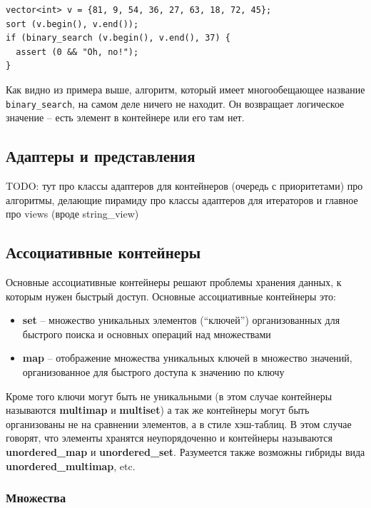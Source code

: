 \documentclass[a4paper,12pt,oneside]{article}
\begin{document}
\begin{lstlisting}
vector<int> v = {81, 9, 54, 36, 27, 63, 18, 72, 45};
sort (v.begin(), v.end());
if (binary_search (v.begin(), v.end(), 37) {
  assert (0 && "Oh, no!");
}
\end{lstlisting}

Как видно из примера выше, алгоритм, который имеет многообещающее название \lstinline!binary_search!, на самом деле ничего не находит. Он возвращает логическое значение -- есть элемент в контейнере или его там нет.

\pagebreak
\subsection{Адаптеры и представления}\label{subsec:adapters}

TODO: тут 
про классы адаптеров для контейнеров (очередь с приоритетами)
про алгоритмы, делающие пирамиду
про классы адаптеров для итераторов
и главное про views (вроде string\_view)

\pagebreak
\subsection{Ассоциативные контейнеры}\label{AssociativeContainers}

Основные ассоциативные контейнеры решают проблемы хранения данных, к которым нужен быстрый доступ. Основные ассоциативные контейнеры это:

\begin{itemize}
\item \textbf{set} -- множество уникальных элементов (``ключей'') организованных для быстрого поиска и основных операций над множествами
\item \textbf{map} -- отображение множества уникальных ключей в множество значений, организованное для быстрого доступа к значению по ключу
\end{itemize}

Кроме того ключи могут быть не уникальными (в этом случае контейнеры называются \textbf{multimap} и \textbf{multiset}) а так же контейнеры могут быть организованы не на сравнении элементов, а в стиле хэш-таблиц. В этом случае говорят, что элементы хранятся неупорядоченно и контейнеры называются \textbf{unordered\_map} и \textbf{unordered\_set}. Разумеется также возможны гибриды вида \textbf{unordered\_multimap}, etc.

\subsubsection{Множества}
\end{document}
